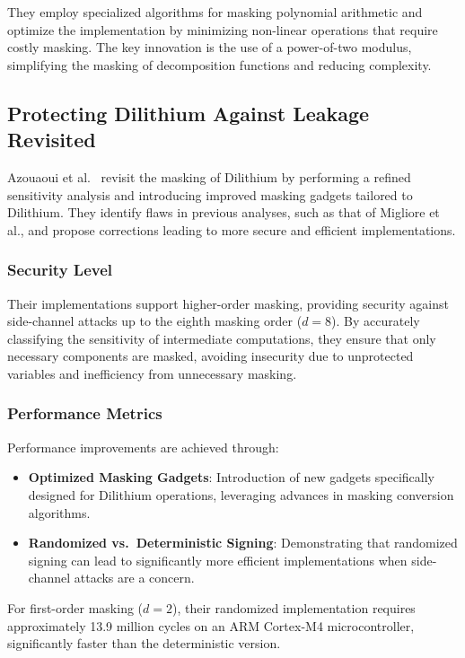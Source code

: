 They employ specialized algorithms for masking polynomial arithmetic and optimize the implementation by minimizing non-linear operations that require costly masking. The key innovation is the use of a power-of-two modulus, simplifying the masking of decomposition functions and reducing complexity.

\subsection{Protecting Dilithium Against Leakage Revisited}

Azouaoui et al.\ \cite{Azouaoui22} revisit the masking of Dilithium by performing a refined sensitivity analysis and introducing improved masking gadgets tailored to Dilithium. They identify flaws in previous analyses, such as that of Migliore et al., and propose corrections leading to more secure and efficient implementations.

\subsubsection{Security Level}

Their implementations support higher-order masking, providing security against side-channel attacks up to the eighth masking order ($d=8$). By accurately classifying the sensitivity of intermediate computations, they ensure that only necessary components are masked, avoiding insecurity due to unprotected variables and inefficiency from unnecessary masking.

\subsubsection{Performance Metrics}

Performance improvements are achieved through:

\begin{itemize}
    \item \textbf{Optimized Masking Gadgets}: Introduction of new gadgets specifically designed for Dilithium operations, leveraging advances in masking conversion algorithms.
    \item \textbf{Randomized vs.\ Deterministic Signing}: Demonstrating that randomized signing can lead to significantly more efficient implementations when side-channel attacks are a concern.
\end{itemize}

For first-order masking ($d=2$), their randomized implementation requires approximately 13.9 million cycles on an ARM Cortex-M4 microcontroller, significantly faster than the deterministic version.

